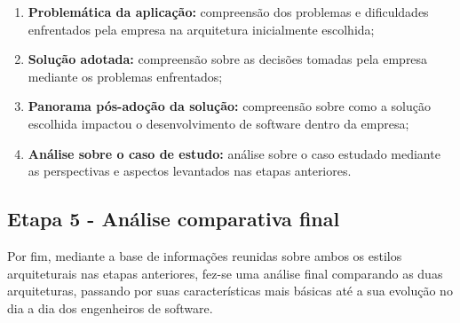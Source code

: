 \begin{enumerate}
    \item \textbf{Problemática da aplicação:} compreensão dos problemas e dificuldades enfrentados
        pela empresa na arquitetura inicialmente escolhida;
    \item \textbf{Solução adotada:} compreensão sobre as decisões tomadas pela empresa mediante os
        problemas enfrentados;
    \item \textbf{Panorama pós-adoção da solução:} compreensão sobre como a solução escolhida
        impactou o desenvolvimento de software dentro da empresa;
    \item \textbf{Análise sobre o caso de estudo:} análise sobre o caso estudado mediante as
        perspectivas e aspectos levantados nas etapas anteriores.
\end{enumerate}

\subsection{Etapa 5 - Análise comparativa final}

Por fim, mediante a base de informações reunidas sobre ambos os estilos arquiteturais nas etapas
anteriores, fez-se uma análise final comparando as duas arquiteturas, passando por suas
características mais básicas até a sua evolução no dia a dia dos engenheiros de software.
